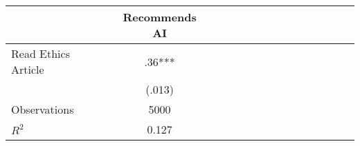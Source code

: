\begin{tabular}{l*{14}{c}}
                    &\multicolumn{1}{c}{Recommends AI}\\
\hline
Read Ethics Article &         .36***\\
                    &      (.013)   \\
\hline
Observations        &        5000   \\
\(R^{2}\)           &       0.127   \\
\end{tabular}
